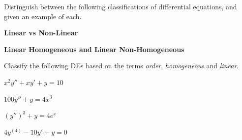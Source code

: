 \newpage

\problem Distinguish between the following classifications of
differential equations, and given an example of each.

{\bf Linear vs Non-Linear}
\vfill

{\bf Linear Homogeneous and Linear Non-Homogeneous}
\vfill


 

\newpage 
Classify the following DEs based on the terms {\em order}, {\em
  homogeneous} and {\em linear}.

\vfill

$x^2 y'' + x y' + y = 10$ \vfill

 $ 100 y'' +  y = 4x^3$
 \vfill

 $ (y'')^3 + y = 4 e^{x}$
 \vfill

 $ 4 y^{(4)} - 10 y' + y = 0 $ \vfill





